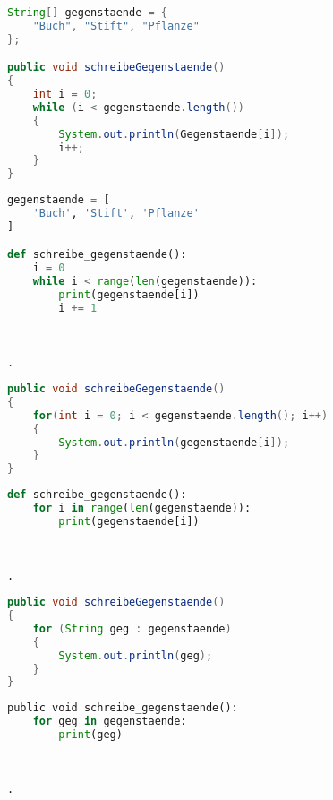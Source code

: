 \begin{minipage}{.5\linewidth}
\begin{lstlisting}[language=java,caption={while-Schleife Java},captionpos=b,label={lst:java:while},frame=none]
String[] gegenstaende = {
    "Buch", "Stift", "Pflanze"
};

public void schreibeGegenstaende()
{
    int i = 0;
    while (i < gegenstaende.length())
    {
        System.out.println(Gegenstaende[i]);
        i++;
    }
}
\end{lstlisting}
\end{minipage}
\begin{minipage}{.5\linewidth}
\begin{lstlisting}[language=python,caption={while-Schleife Python},captionpos=b,label={lst:python:while},frame=l]
gegenstaende = [
    'Buch', 'Stift', 'Pflanze'
]

def schreibe_gegenstaende():
    i = 0
    while i < range(len(gegenstaende)):
        print(gegenstaende[i])
        i += 1
        
        

.
\end{lstlisting}
\end{minipage}

\begin{minipage}{.5\linewidth}
\begin{lstlisting}[language=java,caption={for-Schleife Java},captionpos=b,label={lst:java:for},frame=none]
public void schreibeGegenstaende()
{
    for(int i = 0; i < gegenstaende.length(); i++)
    {
        System.out.println(gegenstaende[i]);
    }
}
\end{lstlisting}
\end{minipage}
\begin{minipage}{.5\linewidth}
\begin{lstlisting}[language=python,caption={for-Schleife Python},captionpos=b,label={lst:python:for},frame=l]
def schreibe_gegenstaende():
    for i in range(len(gegenstaende)):
        print(gegenstaende[i])
        
        

.
\end{lstlisting}
\end{minipage}

\begin{minipage}{.5\linewidth}
\begin{lstlisting}[language=java,caption={foreach-Schleife Java},captionpos=b,label={lst:java:foreach},frame=none]
public void schreibeGegenstaende()
{
    for (String geg : gegenstaende)
    {
        System.out.println(geg);
    }
}
\end{lstlisting}
\end{minipage}
\begin{minipage}{.5\linewidth}
\begin{lstlisting}[language=python,caption={foreach-Schleife Python},captionpos=b,label={lst:python:foreach},frame=l]
public void schreibe_gegenstaende():
    for geg in gegenstaende:
        print(geg)
        
        

.
\end{lstlisting}
\end{minipage}

